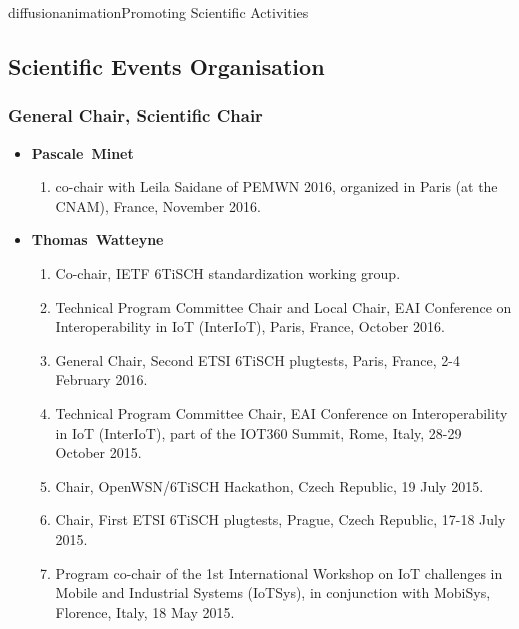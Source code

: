 \documentclass{ra2016}
\newcommand{\pascale}          {\textbf{Pascale~Minet}}
\newcommand{\thomas}           {\textbf{Thomas~Watteyne}}
\begin{document}
\begin{module}{diffusion}{animation}{Promoting Scientific Activities}



\subsection{Scientific Events Organisation}
    \subsubsection{General Chair, Scientific Chair}
    \begin{itemize}
    \item \pascale
        \begin{enumerate}
            \item co-chair with Leila Saidane of PEMWN 2016, organized in Paris (at the CNAM), France, November 2016.
        \end{enumerate}
    \item \thomas
        \begin{enumerate}
            \item Co-chair, IETF 6TiSCH standardization working group.
            \item Technical Program Committee Chair and Local Chair,  EAI Conference on Interoperability in IoT (InterIoT), Paris, France, October 2016.
            \item General Chair, Second ETSI 6TiSCH plugtests, Paris, France, 2-4 February 2016.
            \item Technical Program Committee Chair, EAI Conference on Interoperability in IoT (InterIoT), part of the IOT360 Summit, Rome, Italy, 28-29 October 2015.
            \item Chair, OpenWSN/6TiSCH Hackathon, Czech Republic, 19 July 2015.
            \item Chair, First ETSI 6TiSCH plugtests, Prague, Czech Republic, 17-18 July 2015.
            \item Program co-chair of the 1st International Workshop on IoT challenges in Mobile and Industrial Systems (IoT­Sys), in conjunction with MobiSys, Florence, Italy, 18 May 2015.

\end{enumerate}
\end{itemize}
\end{module}
\end{document}
